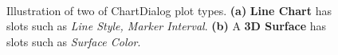 \documentclass[11pt,dvipdfm]{article}
\begin{document}
\begin{figure}[t]
\centering
{}~

\caption{Illustration of two of ChartDialog plot types. \textbf{(a)} \textbf{Line Chart} has slots such as \textit{Line Style, Marker Interval}.
\textbf{ (b)} A \textbf{3D Surface}  has slots such as \textit{Surface Color}.
}
\label{fig:slotsfortwo}
\end{figure}
\end{document}
